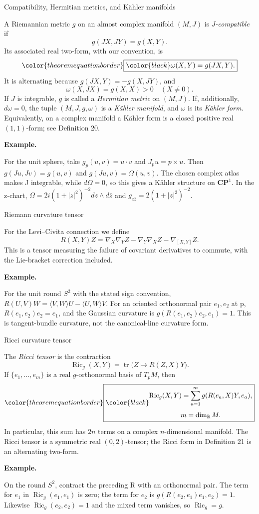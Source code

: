 \documentclass[11pt]{article}
\makeatletter
\newcommand{\R}{\mathbb R}
\newcommand{\Ric}{\operatorname{Ric}}
\newcommand{\theoremboxed}[1]{%
  {\color{theoremequationborder}\boxed{\color{black}#1}}%
}
\newcounter{definition}
\newcommand{\CP}{\mathbf{CP}}
\newcommand{\exampleheading}{\par\medskip\textbf{Example.}\par\smallskip}
\newcommand{\currentdefinition}[1]{\protected@edef\@currentlabel{#1}}
\makeatother
\begin{document}
\begin{definitionbox}{Compatibility, Hermitian metrics, and K\"ahler manifolds}
\currentdefinition{\thedefinition}
\label{source:S18}

A Riemannian metric $g$ on an almost complex manifold $(M,J)$ is
\emph{$J$-compatible} if
\[
g(JX,JY)=g(X,Y).
\]
Its associated real two-form, with our convention, is
\[
\theoremboxed{\omega(X,Y)=g(JX,Y).}
\]
It is alternating because $g(JX,Y)=-g(X,JY)$, and
\[
\omega(X,JX)=g(X,X)>0\quad(X\ne0).
\]
If $J$ is integrable, $g$ is called a \emph{Hermitian metric} on $(M,J)$.
If, additionally, $d\omega=0$, the tuple $(M,J,g,\omega)$ is a
\emph{K\"ahler manifold}, and $\omega$ is its \emph{K\"ahler form}.
Equivalently, on a complex manifold a K\"ahler form is a closed positive
real $(1,1)$-form; see Definition 20.


\exampleheading
For the unit sphere, take $g_p(u,v)=u\cdot v$ and $J_pu=p\times u$. Then $g(Ju,Jv)=g(u,v)$ and $g(Ju,v)=\Omega(u,v)$. The chosen complex atlas makes J integrable, while $d\Omega=0$, so this gives a K\"ahler structure on $\CP^1$. In the z-chart, $\Omega=2i(1+|z|^2)^{-2}dz\wedge d\bar z$ and $g_{z\bar z}=2(1+|z|^2)^{-2}$.
\end{definitionbox}

\begin{definitionbox}{Riemann curvature tensor}
\currentdefinition{\thedefinition}
\label{source:S19}

For the Levi--Civita connection we define
\[
R(X,Y)Z=\nabla_X\nabla_YZ-\nabla_Y\nabla_XZ-\nabla_{[X,Y]}Z.
\]
This is a tensor measuring the failure of covariant derivatives to
commute, with the Lie-bracket correction included.


\exampleheading
For the unit round $S^2$ with the stated sign convention, $R(U,V)W=\langle V,W\rangle U-\langle U,W\rangle V$. For an oriented orthonormal pair $e_1,e_2$ at p, $R(e_1,e_2)e_2=e_1$, and the Gaussian curvature is $g(R(e_1,e_2)e_2,e_1)=1$. This is tangent-bundle curvature, not the canonical-line curvature form.
\end{definitionbox}

\begin{definitionbox}{Ricci curvature tensor}
\currentdefinition{\thedefinition}
\label{source:S20}

The \emph{Ricci tensor} is the contraction
\[
\Ric_g(X,Y)=\operatorname{tr}\bigl(Z\longmapsto R(Z,X)Y\bigr).
\]
If $\{e_1,\ldots,e_m\}$ is a real $g$-orthonormal basis of $T_pM$, then
\[
\theoremboxed{
\begin{gathered}
\Ric_g(X,Y)=\sum_{a=1}^{m}g(R(e_a,X)Y,e_a),\\[4pt]
m=\dim_{\R}M.
\end{gathered}
}
\]
In particular, this sum has $2n$ terms on a complex $n$-dimensional
manifold. The Ricci tensor is a symmetric real $(0,2)$-tensor; the
Ricci form in Definition 21 is an alternating two-form.


\exampleheading
On the round $S^2$, contract the preceding R with an orthonormal pair. The term for $e_1$ in $\Ric_g(e_1,e_1)$ is zero; the term for $e_2$ is $g(R(e_2,e_1)e_1,e_2)=1$. Likewise $\Ric_g(e_2,e_2)=1$ and the mixed term vanishes, so $\Ric_g=g$.
\end{definitionbox}
\end{document}
